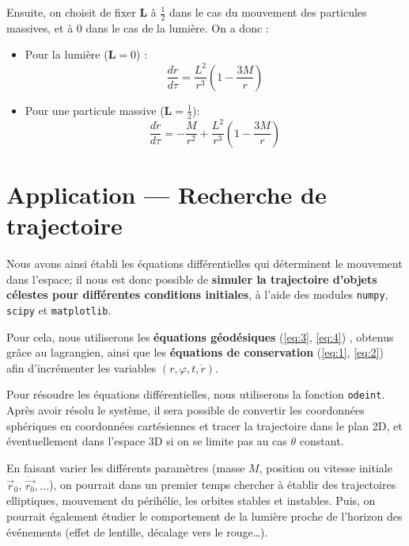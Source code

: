 \documentclass{article}
\begin{document}
Ensuite, on choisit de fixer $\mathbf{L}$ à $\frac{1}{2}$ dans le cas du mouvement des particules massives, et à $0$ dans le cas de la lumière. On a donc :
\begin{itemize}[label=\textendash]
    \item Pour la lumière ($\mathbf L=0$) :
    \begin{equation}\label{eq:3}
        \frac{d\dot r}{d\tau}=\frac{L^2}{r^3}\left(1-\frac{3M}{r}\right)
    \end{equation}
    \item Pour une particule massive ($\mathbf L=\frac{1}{2}$): 
    \begin{equation}\label{eq:4}\frac{d\dot r}{d\tau}=-\frac{M}{r^2}+\frac{L^2}{r^3}\left(1-\frac{3M}{r}\right)\end{equation}
\end{itemize}

\section{Application — Recherche de trajectoire}
Nous avons ainsi établi les équations différentielles qui déterminent le mouvement dans l’espace; il nous est donc possible de \textbf{simuler la trajectoire d'objets célestes pour différentes conditions initiales}, à l'aide des modules \texttt{numpy}, \texttt{scipy} et \texttt{matplotlib}. 

Pour cela, nous utiliserons les \textbf{équations géodésiques} (\ref{eq:3}, \ref{eq:4}) , obtenus grâce au lagrangien, ainsi que les \textbf{équations de conservation} (\ref{eq:1}, \ref{eq:2}) afin d'incrémenter les variables $(r,\varphi,t,\dot r)$. 

Pour résoudre les équations différentielles, nous utiliserons la fonction \texttt{odeint}. Après avoir résolu le système, il sera possible de convertir les coordonnées sphériques en coordonnées cartésiennes et tracer la trajectoire dans le plan 2D, et éventuellement dans l'espace 3D si on se limite pas au cas $\theta$ constant. 

En faisant varier les différents paramètres (masse $M$, position ou vitesse initiale $\vec r_0$, $\dot{\vec{r_0}},\dots$), on pourrait dans un premier temps chercher à établir des trajectoires elliptiques, mouvement du périhélie, les orbites stables et instables. Puis, on pourrait également étudier le comportement de la lumière proche de l'horizon des événements (effet de lentille, décalage vers le rouge\dots). 
\end{document}
